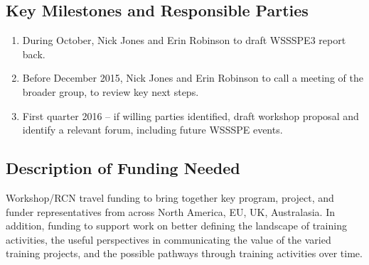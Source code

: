 \subsection{Key Milestones and Responsible Parties}
\begin{enumerate}

\item During October, Nick Jones and Erin Robinson to draft WSSSPE3 report back.

\item Before December 2015, Nick Jones and Erin Robinson to call a meeting of
the broader group, to review key next steps.
    
\item First quarter 2016 -- if willing parties identified, draft workshop proposal
and identify a relevant forum, including future WSSSPE events.
    
\end{enumerate}

\subsection{Description of Funding Needed}

Workshop/RCN travel funding to bring together key program, project, and funder
representatives from across North America, EU, UK, Australasia. In addition,
funding to support work on better defining the landscape of training activities,
the useful perspectives in communicating the value of the varied training
projects, and the possible pathways through training activities over time.

